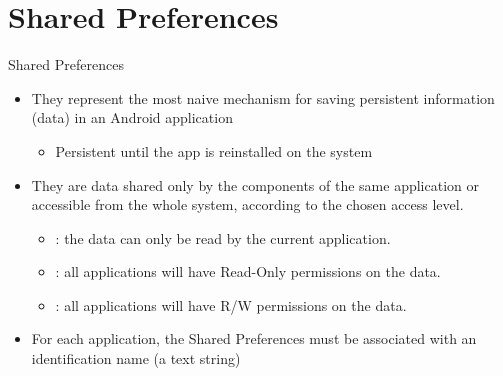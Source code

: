 \documentclass{beamer}
\begin{document}
\section{Shared Preferences}
  \begin{frame}{Shared Preferences}
    \begin{itemize}\itemsep10pt
      \item They represent the most naive mechanism for saving persistent
      information (data) in an Android application
      \begin{itemize}
        \item Persistent until the app is reinstalled on the system
      \end{itemize}
        \item They are data shared only by the components of the same
        application or accessible from the whole system, according to the chosen
        access level.
      \begin{itemize}
        \item {}: the data can only be read by the
        current application.
        \item {}: all applications will have
        Read-Only permissions on the data.
        \item {}: all applications will have
        R/W permissions on the data.
      \end{itemize}
      \item For each application, the Shared Preferences must be associated with
      an identification name (a text string) 
    \end{itemize}
  \end{frame}
\end{document}
